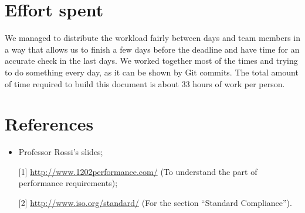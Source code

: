 \documentclass[12pt,titlepage]{article}
\begin{document}
\begin{landscape}
\newpage
\begin{figure}[h]
\end{figure}
\clearpage
\end{landscape}

\pagebreak
\pagebreak
\pagebreak
\section{Effort spent}\label{sec:crit}
We managed to distribute the workload fairly between days and team members in a way that allows us to finish a few days before the deadline and have time for an accurate check in the last days.
We worked together most of the times and trying to do something every day, as it can be shown by Git commits.
The total amount of time required to build this document is about 33 hours of work per person.
\pagebreak

\section{References}\label{sec:crit}
\begin{itemize}
\item Professor Rossi's slides;
\item [{[1]}] \url{http://www.1202performance.com/} (To understand the part of performance requirements);
\item [{[2]}] \url{http://www.iso.org/standard/} (For the section ``Standard Compliance'').
\end{itemize}
\end{document}
